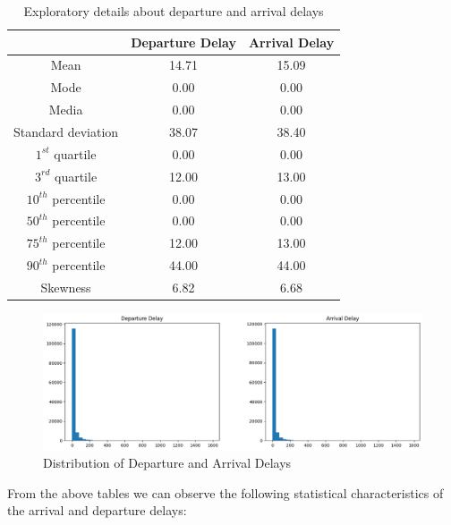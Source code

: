 \documentclass[11pt]{article}
\begin{document}
\begin{table}[!h]
    \centering
    \begin{tabular}{|c|c|c|}
        \hline
  & Departure Delay & Arrival Delay \\ 
 \hline
 Mean & 14.71 & 15.09 \\ 
\hline
 Mode & 0.00 & 0.00 \\ 
 \hline
 Media & 0.00 & 0.00 \\ 
 \hline
 Standard deviation & 38.07 & 38.40 \\ 
 \hline
 $1^{st}$ quartile & 0.00 & 0.00 \\ 
 \hline
 $3^{rd}$ quartile & 12.00 & 13.00 \\ 
 \hline
 $10^{th}$ percentile & 0.00 & 0.00 \\ 
 \hline
 $50^{th}$ percentile & 0.00 & 0.00 \\ 
 \hline
 $75^{th}$ percentile & 12.00 & 13.00 \\ 
 \hline
 $90^{th}$ percentile & 44.00 & 44.00 \\ 
 \hline
 Skewness & 6.82 & 6.68 \\ 
 \hline
    \end{tabular}
    \caption{Exploratory details about departure and arrival delays}
    \label{tab:cov}
\end{table}

\begin{figure}[h]
\centering
\includegraphics[width=0.9\linewidth]{project_files/project_14_1.png}
\caption{Distribution of Departure and Arrival Delays}
\end{figure}

From the above tables we can observe the following statistical characteristics of the arrival and departure delays:
\end{document}
